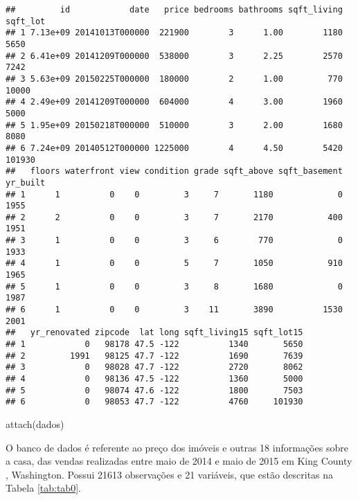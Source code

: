 \documentclass[
]{article}
\newenvironment{Shaded}{\begin{snugshade}}{\end{snugshade}}
\newcommand{\FunctionTok}[1]{\textcolor[rgb]{0.00,0.00,0.00}{#1}}
\newcommand{\NormalTok}[1]{#1}
\begin{document}
\begin{verbatim}
##         id            date   price bedrooms bathrooms sqft_living sqft_lot
## 1 7.13e+09 20141013T000000  221900        3      1.00        1180     5650
## 2 6.41e+09 20141209T000000  538000        3      2.25        2570     7242
## 3 5.63e+09 20150225T000000  180000        2      1.00         770    10000
## 4 2.49e+09 20141209T000000  604000        4      3.00        1960     5000
## 5 1.95e+09 20150218T000000  510000        3      2.00        1680     8080
## 6 7.24e+09 20140512T000000 1225000        4      4.50        5420   101930
##   floors waterfront view condition grade sqft_above sqft_basement yr_built
## 1      1          0    0         3     7       1180             0     1955
## 2      2          0    0         3     7       2170           400     1951
## 3      1          0    0         3     6        770             0     1933
## 4      1          0    0         5     7       1050           910     1965
## 5      1          0    0         3     8       1680             0     1987
## 6      1          0    0         3    11       3890          1530     2001
##   yr_renovated zipcode  lat long sqft_living15 sqft_lot15
## 1            0   98178 47.5 -122          1340       5650
## 2         1991   98125 47.7 -122          1690       7639
## 3            0   98028 47.7 -122          2720       8062
## 4            0   98136 47.5 -122          1360       5000
## 5            0   98074 47.6 -122          1800       7503
## 6            0   98053 47.7 -122          4760     101930
\end{verbatim}

\begin{Shaded}
\begin{Highlighting}[]
\FunctionTok{attach}\NormalTok{(dados)}
\end{Highlighting}
\end{Shaded}

O banco de dados é referente ao preço dos imóveis e outras 18 informações sobre a casa, das vendas realizadas entre maio de 2014 e maio de 2015 em King County , Washington. Possui 21613 observações e 21 variáveis, que estão descritas na Tabela \ref{tab:tab0}.
\end{document}
